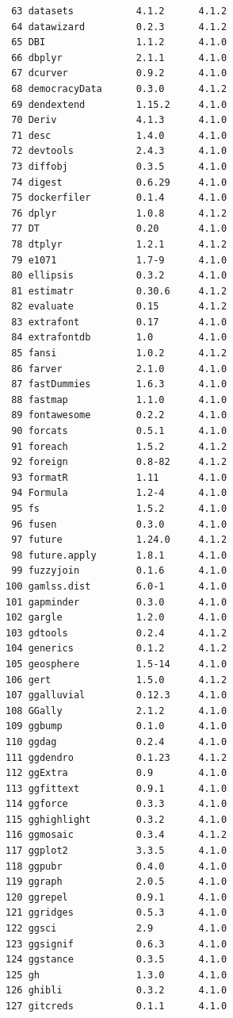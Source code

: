 \documentclass[
  a4paper,
  pandoc,
  ja=standard,
  jafont=haranoaji]{bxjsbook}
\begin{document}
\begin{verbatim}
 63 datasets           4.1.2      4.1.2
 64 datawizard         0.2.3      4.1.2
 65 DBI                1.1.2      4.1.0
 66 dbplyr             2.1.1      4.1.0
 67 dcurver            0.9.2      4.1.0
 68 democracyData      0.3.0      4.1.2
 69 dendextend         1.15.2     4.1.0
 70 Deriv              4.1.3      4.1.0
 71 desc               1.4.0      4.1.0
 72 devtools           2.4.3      4.1.0
 73 diffobj            0.3.5      4.1.0
 74 digest             0.6.29     4.1.0
 75 dockerfiler        0.1.4      4.1.0
 76 dplyr              1.0.8      4.1.2
 77 DT                 0.20       4.1.0
 78 dtplyr             1.2.1      4.1.2
 79 e1071              1.7-9      4.1.0
 80 ellipsis           0.3.2      4.1.0
 81 estimatr           0.30.6     4.1.2
 82 evaluate           0.15       4.1.2
 83 extrafont          0.17       4.1.0
 84 extrafontdb        1.0        4.1.0
 85 fansi              1.0.2      4.1.2
 86 farver             2.1.0      4.1.0
 87 fastDummies        1.6.3      4.1.0
 88 fastmap            1.1.0      4.1.0
 89 fontawesome        0.2.2      4.1.0
 90 forcats            0.5.1      4.1.0
 91 foreach            1.5.2      4.1.2
 92 foreign            0.8-82     4.1.2
 93 formatR            1.11       4.1.0
 94 Formula            1.2-4      4.1.0
 95 fs                 1.5.2      4.1.0
 96 fusen              0.3.0      4.1.0
 97 future             1.24.0     4.1.2
 98 future.apply       1.8.1      4.1.0
 99 fuzzyjoin          0.1.6      4.1.0
100 gamlss.dist        6.0-1      4.1.0
101 gapminder          0.3.0      4.1.0
102 gargle             1.2.0      4.1.0
103 gdtools            0.2.4      4.1.2
104 generics           0.1.2      4.1.2
105 geosphere          1.5-14     4.1.0
106 gert               1.5.0      4.1.2
107 ggalluvial         0.12.3     4.1.0
108 GGally             2.1.2      4.1.0
109 ggbump             0.1.0      4.1.0
110 ggdag              0.2.4      4.1.0
111 ggdendro           0.1.23     4.1.2
112 ggExtra            0.9        4.1.0
113 ggfittext          0.9.1      4.1.0
114 ggforce            0.3.3      4.1.0
115 gghighlight        0.3.2      4.1.0
116 ggmosaic           0.3.4      4.1.2
117 ggplot2            3.3.5      4.1.0
118 ggpubr             0.4.0      4.1.0
119 ggraph             2.0.5      4.1.0
120 ggrepel            0.9.1      4.1.0
121 ggridges           0.5.3      4.1.0
122 ggsci              2.9        4.1.0
123 ggsignif           0.6.3      4.1.0
124 ggstance           0.3.5      4.1.0
125 gh                 1.3.0      4.1.0
126 ghibli             0.3.2      4.1.0
127 gitcreds           0.1.1      4.1.0

\end{verbatim}
\end{document}
